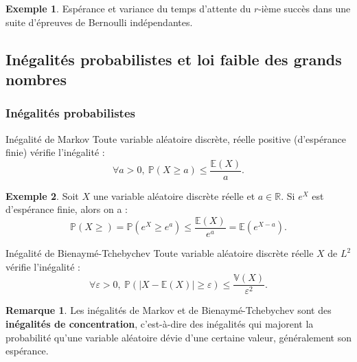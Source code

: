 \documentclass[french]{article}
\renewcommand{\P}{\mathbb{P}}
\newcommand{\R}{\mathbb{R}}
\newcommand{\E}{\mathbb{E}}
\newcommand{\V}{\mathbb{V}}
\theoremstyle{plain}
\theoremstyle{definition}
\newtheorem*{ex}{Exemple}
\newtheorem*{rmq}{Remarque}
\theoremstyle{remark}
\begin{document}
\begin{ex}
	Espérance et variance du temps d'attente du $r$-ième succès dans une suite d'épreuves de Bernoulli indépendantes.
\end{ex}

\subsection{Inégalités probabilistes et loi faible des grands nombres}

\subsubsection*{Inégalités probabilistes}

\begin{thm}{Inégalité de Markov}%
	Toute variable aléatoire discrète, réelle positive (d'espérance finie) vérifie l'inégalité :
	$$\forall a>0,\ \P(X\geqslant a)\leqslant\frac{\E(X)}{a}.$$
\end{thm}

\begin{ex}
	Soit $X$ une variable aléatoire discrète réelle et $a\in\R$. Si $e^X$ est d'espérance finie, alors on a :
	$$\P(X\geqslant)=\P(e^X\geqslant e^a)\leqslant\frac{\E(X)}{e^a}=\E(e^{X-a}).$$
\end{ex}

\begin{thm}{Inégalité de Bienaymé-Tchebychev}
	Toute variable aléatoire discrète réelle $X$ de $L^2$ vérifie l'inégalité :
	$$\forall\varepsilon>0,\ \P(\lvert X-\E(X)\rvert\geqslant\varepsilon)\leqslant\frac{\V(X)}{\varepsilon^2}.$$
\end{thm}

\begin{rmq}
	Les inégalités de Markov et de Bienaymé-Tchebychev sont des \textbf{inégalités de concentration}, c'est-à-dire des inégalités qui majorent la probabilité qu'une variable aléatoire dévie d'une certaine valeur, généralement son espérance.
\end{rmq}
\end{document}
